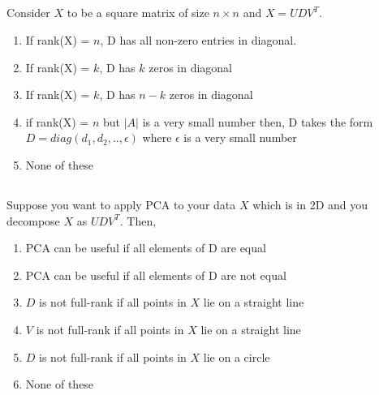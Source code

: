 \begin{frame}
\section{}
  Consider $X$ to be a square matrix of size $n\times n$ and $X=UDV^T$.
    \begin{enumerate}[label=(\Alph*)]
      \item If rank(X) = $n$, D has all non-zero entries in diagonal. %
     \item If rank(X) = $k$, D has $k$ zeros in diagonal
     \item If rank(X) = $k$, D has $n-k$ zeros in diagonal  %
     \item if rank(X) = $n$ but $\vert A \vert $ is a very small number then, D takes the form  $D=diag(d_1,d_2,..,\epsilon)$ where $\epsilon$ is a very small number   %
     \item None of these  %
    \end{enumerate}
\end{frame}

\begin{frame}
\section{}
Suppose you want to apply PCA to your data $X$
  which is in 2D and you decompose $X$ as $UDV^T$. Then,
    \begin{enumerate}[label=(\Alph*)]
      \item PCA can be useful if all elements of D are equal
     \item PCA can be useful if all elements of D are not equal   %
     \item   $D$ is not full-rank if all points in $X$ lie on a straight line   %
     \item   $V$ is not full-rank if all points in $X$ lie on a straight line
     \item   $D$ is not full-rank if all points in $X$ lie on a circle
     \item None of these    %
    \end{enumerate}
\end{frame}
